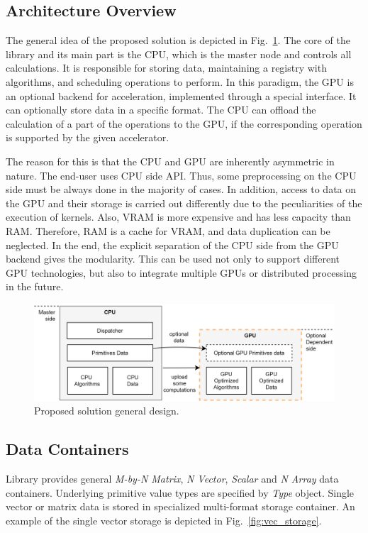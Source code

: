 \subsection{Architecture Overview}

The general idea of the proposed solution is depicted in Fig.~\ref{fig:design}. 
The core of the library and its main part is the CPU, which is the master node and controls all calculations. 
It is responsible for storing data, maintaining a registry with algorithms, and scheduling operations to perform. 
In this paradigm, the GPU is an optional backend for acceleration, implemented through a special interface. 
It can optionally store data in a specific format. 
The CPU can offload the calculation of a part of the operations to the GPU, if the corresponding operation is supported by the given accelerator.

The reason for this is that the CPU and GPU are inherently asymmetric in nature. 
The end-user uses CPU side API. Thus, some preprocessing on the CPU side must be always done in the majority of cases. In addition, access to data on the GPU and their storage is carried out differently due to the peculiarities of the execution of kernels. 
Also, VRAM is more expensive and has less capacity than RAM.
Therefore, RAM is a cache for VRAM, and data duplication can be neglected. 
In the end, the explicit separation of the CPU side from the GPU backend gives the modularity. 
This can be used not only to support different GPU technologies, but also to integrate multiple GPUs or distributed processing in the future.

\begin{figure}[t]
\centering
\includegraphics[width=0.95\linewidth]{figures/design_idea.png}
\caption{Proposed solution general design.}
\label{fig:design}
\end{figure}
    
\subsection{Data Containers}

Library provides general \textit{M-by-N Matrix}, \textit{N Vector}, \textit{Scalar} and \textit{N Array} data containers.
Underlying primitive value types are specified by \textit{Type} object. 
Single vector or matrix data is stored in specialized multi-format storage container. An example of the single vector storage is depicted in Fig.~\ref{fig:vec_storage}. 

